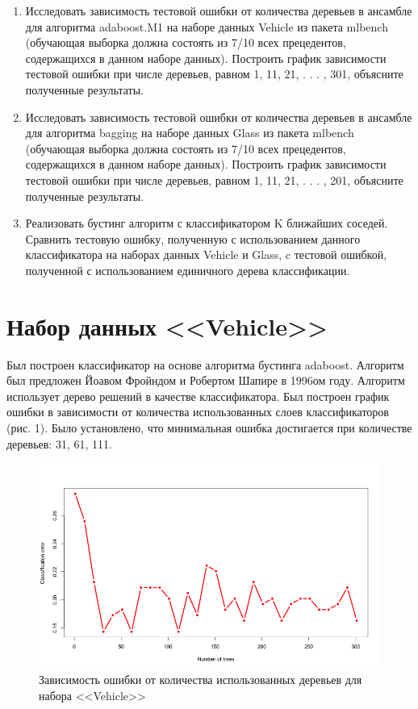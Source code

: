\documentclass[]{article}
\numberwithin{equation}{section}
\begin{document}
    \begin{enumerate}
        \item Исследовать зависимость тестовой ошибки от количества деревьев в ансамбле для алгоритма adaboost.M1 на наборе данных Vehicle из пакета mlbench (обучающая выборка должна состоять из 7/10 всех прецедентов, содержащихся в данном наборе данных). Построить график зависимости тестовой ошибки при числе деревьев, равном 1, 11, 21, . . . , 301, объясните полученные результаты.
        \item Исследовать зависимость тестовой ошибки от количества деревьев в ансамбле для алгоритма bagging на наборе данных Glass из пакета mlbench (обучающая выборка должна состоять из 7/10 всех прецедентов, содержащихся в данном наборе данных). Построить график зависимости тестовой ошибки при числе деревьев, равном 1, 11, 21, . . . , 201, объясните полученные результаты.
        \item Реализовать бустинг алгоритм с классификатором K ближайших соседей. Сравнить тестовую ошибку, полученную с использованием данного классификатора на наборах данных Vehicle и Glass, c тестовой ошибкой, полученной с использованием единичного дерева классификации.
    \end{enumerate}

    \newpage
    \section{Набор данных <<Vehicle>>}
    Был построен классификатор на основе алгоритма бустинга adaboost. Алгоритм был предложен Йоавом Фройндом и Робертом Шапире в 1996ом году. Алгоритм использует дерево решений в качестве классификатора. Был построен график ошибки в зависимости от количества использованных слоев классификаторов (рис. 1). Было установлено, что минимальная ошибка достигается при количестве деревьев: 31, 61, 111.
    \begin{figure}[H]
        \centering
        \includegraphics[width = 0.9\linewidth]{data/Vehicle_num_trees.png}
        \caption{Зависимость ошибки от количества использованных деревьев для набора <<Vehicle>>}
    \end{figure}
\end{document}
